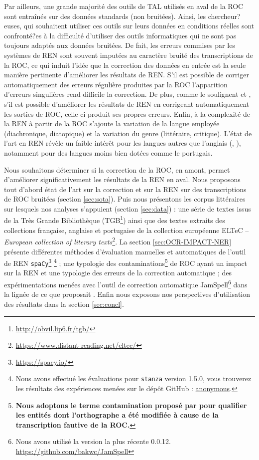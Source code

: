 Par ailleurs, une grande majorité des outils de TAL utilisés en aval de la ROC sont entraînés sur des données standards (non bruitées). Ainsi, les chercheur?euses, qui souhaitent utiliser ces outils sur leurs données en conditions réelles sont confronté?es à la difficulté d'utiliser des outils informatiques qui ne sont pas toujours adaptés aux données bruitées. De fait, les erreurs commises par les systèmes de REN sont souvent imputées au caractère bruité des transcriptions de la ROC, ce qui induit l'idée que la correction des données en entrée est la seule manière pertinente d'améliorer les résultats de REN. 
S'il est possible de corriger automatiquement des erreurs régulière produites par la ROC l'apparition d’erreurs singulières rend difficile la correction. De plus, comme le soulignent \cite{huynh:hal-03034484} et \cite{petkovic:hal-04063970}, s'il est possible d'améliorer les résultats de REN en corrigeant automatiquement les sorties de ROC, celle-ci produit ses propres erreurs. Enfin, à la complexité de la REN à partir de la ROC s'ajoute la variation de la langue employée (diachronique, diatopique) %
et la variation du genre (littéraire, critique). L'état de l'art en REN révèle un faible intérêt pour les langues autres que l’anglais (\cite{lejeune:hal-01294127}, \cite{rahimi-etal-2019-massively}), notamment pour des langues moins bien dotées comme le portugais.

Nous souhaitons déterminer si la correction de la ROC, en amont, permet d’améliorer  significativement les résultats de la REN en aval. Nous proposons tout d'abord état de l'art sur la correction et sur la REN sur des transcriptions de ROC bruitées (section \ref{sec:sota}). Puis nous présentons les corpus littéraires sur lesquels nos analyses s'appuient (section \ref{sec:data}) : une série de textes issus de la Très Grande Bibliothèque (TGB\footnote{\url{http://obvil.lip6.fr/tgb/}}) ainsi que des textes extraits des collections française, anglaise et portugaise de la collection européenne ELTeC -- \textit{European collection of literary texts}\footnote{\url{https://www.distant-reading.net/eltec/}}. La section \ref{sec:OCR-IMPACT-NER} présente différentes méthodes d'évaluation manuelles et automatiques de l'outil de REN \texttt{spaCy}\footnote{\url{https://spacy.io/}} \cite{ines_montani_2023_7715077}\footnote{Nous avons effectué les évaluations pour \texttt{stanza}\cite{qi2020stanza} version 1.5.0, vous trouverez les résultats des expériences menées sur le dépôt GitHub : \url{anonymous}.} ; une typologie des contaminations\footnote{\textbf{Nous adoptons le terme contamination proposé par \cite{hamdi:hal-03615997} pour qualifier les entités dont l'orthographe a été modifiée à cause de la transcription fautive de la ROC.}} de ROC ayant un impact sur la REN et une typologie des erreurs de la correction automatique ; des expérimentations menées avec l’outil de correction automatique JamSpell\footnote{Nous avons utilisé la version la plus récente 0.0.12. \url{https://github.com/bakwc/JamSpell}} dans la lignée de ce que proposait \cite{petkovic2022impact}. Enfin nous exposons nos perspectives d’utilisation des résultats dans la section \ref{sec:concl}.

